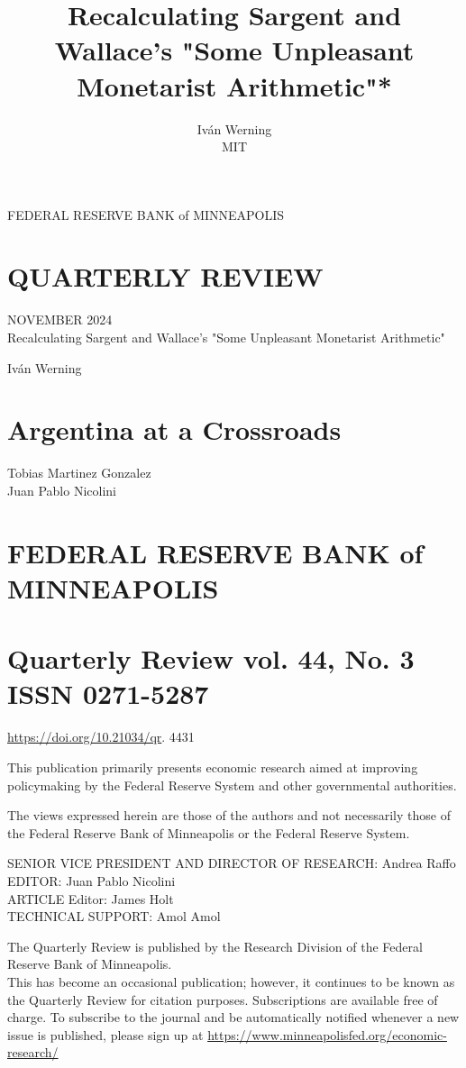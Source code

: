 \documentclass[10pt]{article}
\title{Recalculating Sargent and Wallace's "Some Unpleasant Monetarist Arithmetic"* }
\author{Iván Werning\\
MIT}
\date{}
\begin{document}
\maketitle
FEDERAL RESERVE BANK of MINNEAPOLIS

\section*{QUARTERLY REVIEW}
NOVEMBER 2024\\
Recalculating Sargent and Wallace's "Some Unpleasant Monetarist Arithmetic"

Iván Werning

\section*{Argentina at a Crossroads}
Tobias Martinez Gonzalez\\
Juan Pablo Nicolini

\section*{FEDERAL RESERVE BANK of MINNEAPOLIS}
\section*{Quarterly Review vol. 44, No. 3 \\
 ISSN 0271-5287}
\href{https://doi.org/10.21034/qr}{https://doi.org/10.21034/qr}. 4431

This publication primarily presents economic research aimed at improving policymaking by the Federal Reserve System and other governmental authorities.

The views expressed herein are those of the authors and not necessarily those of the Federal Reserve Bank of Minneapolis or the Federal Reserve System.

SENIOR VICE PRESIDENT AND DIRECTOR OF RESEARCH: Andrea Raffo\\
EDITOR: Juan Pablo Nicolini\\
ARTICLE Editor: James Holt\\
TECHNICAL SUPPORT: Amol Amol

The Quarterly Review is published by the Research Division of the Federal Reserve Bank of Minneapolis.\\
This has become an occasional publication; however, it continues to be known as the Quarterly Review for citation purposes. Subscriptions are available free of charge. To subscribe to the journal and be automatically notified whenever a new issue is published, please sign up at \href{https://www.minneapolisfed.org/economic-research/}{https://www.minneapolisfed.org/economic-research/}
\end{document}

